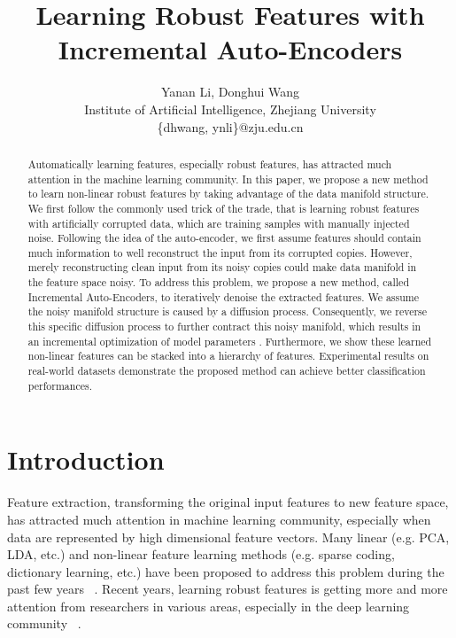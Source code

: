 \documentclass{article}
\title{Learning Robust Features with Incremental Auto-Encoders}
\author{Yanan Li, Donghui Wang \\
Institute of Artificial Intelligence, Zhejiang University\\
\{dhwang, ynli\}@zju.edu.cn}
\begin{document}
\newcommand{\tabincell}[2]{\begin{tabular}{@{}#1@{}}#2\end{tabular}}
\maketitle

\begin{abstract}
  Automatically learning features, especially robust features, has attracted much attention in the machine learning community. In this paper, we propose a new method to learn non-linear robust features by taking advantage of  the data manifold structure. We first follow the commonly used trick of the trade, that is learning robust features with artificially corrupted data, which are training samples with manually injected noise. Following the idea of the auto-encoder, we first assume features should contain much information to well reconstruct the input from its corrupted copies. However, merely reconstructing clean input from its noisy copies could make data manifold in the feature space noisy. To address this problem, we propose a new method, called Incremental Auto-Encoders, to iteratively denoise the extracted features.  We assume the noisy manifold structure is caused by a diffusion process. Consequently, we reverse this specific diffusion process to further contract this noisy manifold, which results in an incremental optimization of model parameters . Furthermore, we show these learned non-linear features can be stacked into a hierarchy of features. Experimental results on real-world datasets demonstrate the proposed method can achieve better classification performances.
\end{abstract}

\section{Introduction}
Feature extraction, transforming the original input features to new feature space, has attracted  much attention in machine learning community, especially when data are represented by high dimensional feature vectors. Many linear (e.g. PCA, LDA, etc.) and non-linear feature learning methods (e.g. sparse coding, dictionary learning, etc.) have been proposed to address this problem during the past few years ~\cite{elad2010sparse,bengio2013representation}. Recent years, learning robust features is getting more and more attention from researchers in various areas, especially in the deep learning community ~\cite{wan2013regularization,farabet2013learning}.
\end{document}
